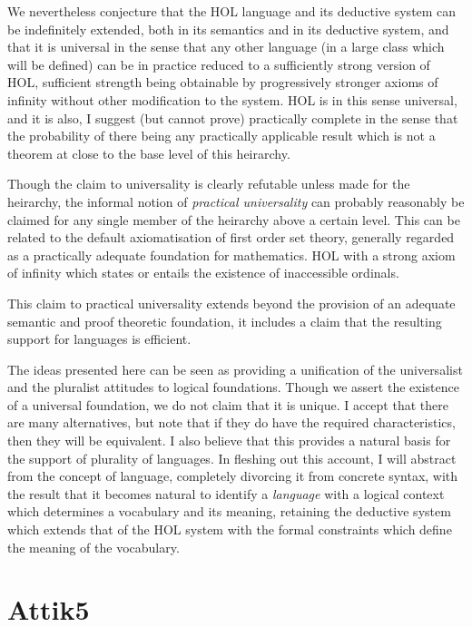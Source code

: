 \documentclass[10pt,titlepage]{book}
\begin{document}
We nevertheless conjecture that the HOL language and its deductive system can be indefinitely extended, both in its semantics and in its deductive system, and that it is universal in the sense that any other language (in a large class which will be defined) can be in practice reduced to a sufficiently strong version of HOL, sufficient strength being obtainable by progressively stronger axioms of infinity without other modification to the system.
HOL is in this sense universal, and it is also, I suggest (but cannot prove) practically complete in the sense that the probability of there being any practically applicable result which is not a theorem at close to the base level of this heirarchy.

Though the claim to universality is clearly refutable unless made for the heirarchy, the informal notion of \emph{practical universality} can probably reasonably be claimed for any single member of the heirarchy above a certain level.
This can be related to the default axiomatisation of first order set theory, generally regarded as a practically adequate foundation for mathematics.
HOL with a strong axiom of infinity which states or entails the existence of inaccessible ordinals.

This claim to practical universality extends beyond the provision of an adequate semantic and proof theoretic foundation, it includes a claim that the resulting support for languages is efficient.

The ideas presented here can be seen as providing a unification of the universalist and the pluralist attitudes to logical foundations.
Though we assert the existence of a universal foundation, we do not claim that it is unique.
I accept that there are many alternatives, but note that if they do have the required characteristics, then they will be equivalent.
I also believe that this provides a natural basis for the support of plurality of languages.
In fleshing out this account, I will abstract from the concept of language, completely divorcing it from concrete syntax, with the result that it becomes natural to identify a \emph{language} with a logical context which determines a vocabulary and its meaning, retaining the deductive system which extends that of the HOL system with the formal constraints which define the meaning of the vocabulary.


\chapter{Attik5}
\end{document}
